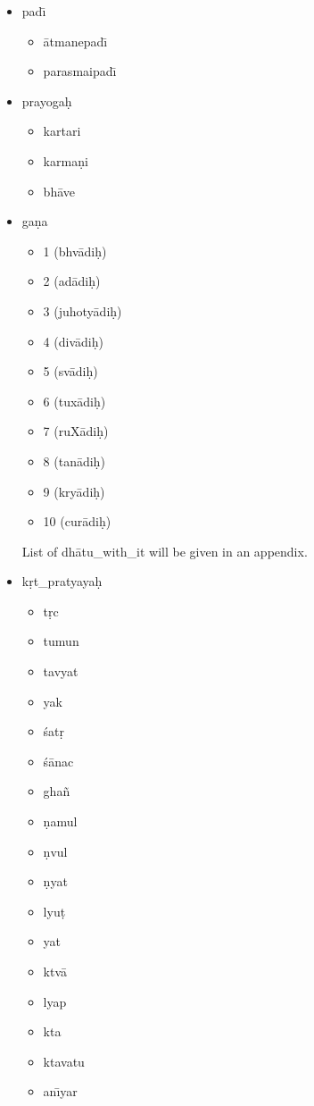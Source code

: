 \documentclass{llncs}
\begin{document}
\begin{itemize}
\item pad{\=\i}
\begin{itemize}
\item {\=a}tmanepad{\=\i}
\item parasmaipad{\=\i}
\end{itemize}

\item prayoga\d{h}
\begin{itemize}
\item kartari
\item karma\d{n}i
\item bh{\=a}ve
\end{itemize}

\item ga\d{n}a
\begin{itemize}
\item 1  (bhv{\=a}di\d{h})
\item 2  (ad{\=a}di\d{h})
\item 3  (juhoty{\=a}di\d{h})
\item 4  (div{\=a}di\d{h})
\item 5  (sv{\=a}di\d{h})
\item 6  (tux{\=a}di\d{h})
\item 7  (ruX{\=a}di\d{h})
\item 8  (tan{\=a}di\d{h})
\item 9  (kry{\=a}di\d{h})
\item 10 (cur{\=a}di\d{h})
\end{itemize}

List of dh\={a}tu\_with\_it will be given in an appendix.\\

\item k\d{r}t\_pratyaya\d{h}
\begin{itemize}
\item t\d{r}c
\item tumun
\item tavyat
\item yak
\item \'{s}at\d{r}
\item \'{s}{\=a}nac
\item gha\~{n}
\item \d{n}amul
\item \d{n}vul
\item \d{n}yat
\item lyu\d{t}
\item yat
\item ktv{\=a}
\item lyap
\item kta
\item ktavatu
\item an{\=\i}yar
\end{itemize}


\end{itemize}
\end{document}

